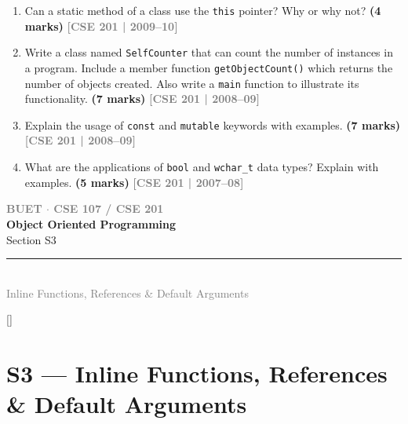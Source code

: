 \documentclass[12pt,a3paper]{article}
\newcommand{\yr}[1]{\hfill\textcolor{gray}{\small\textbf{[#1]}}}
\newcommand{\mk}[1]{\textcolor{orange!70!black}{\small\textbf{(#1 marks)}}}
\newcommand{\secdivider}[4]{%
  \newpage\thispagestyle{empty}%
  \vspace*{\fill}%
  \begin{tcolorbox}[enhanced,colback=#4!7,colframe=#3,boxrule=1.5pt,arc=8pt,
    left=20pt,right=20pt,top=22pt,bottom=22pt,
    shadow={3pt}{-3pt}{0pt}{black!15}]
    \centering
    {\large\textcolor{gray}{\textbf{BUET $\cdot$ CSE 107 / CSE 201}}}\\[8pt]
    {\fontsize{26}{32}\selectfont\bfseries\textcolor{#3}{Object Oriented Programming}}\\[6pt]
    {\fontsize{15}{19}\selectfont\textcolor{dgray}{#1}}\\[12pt]
    \textcolor{#3!60}{\rule{0.5\textwidth}{0.5pt}}\\[6pt]
    {\small\textcolor{gray}{#2}}
  \end{tcolorbox}%
  \vspace*{\fill}\newpage%
}
\begin{document}
\begin{enumerate}
\item Can a static method of a class use the \texttt{this} pointer? Why or why not? \mk{4}
\yr{CSE 201 | 2009--10}




\item Write a class named \texttt{SelfCounter} that can count the number of instances in a program. Include a member function \texttt{getObjectCount()} which returns the number of objects created. Also write a \texttt{main} function to illustrate its functionality. \mk{7}
\yr{CSE 201 | 2008--09}




\item Explain the usage of \texttt{const} and \texttt{mutable} keywords with examples. \mk{7}
\yr{CSE 201 | 2008--09}




\item What are the applications of \texttt{bool} and \texttt{wchar\_t} data types? Explain with examples. \mk{5}
\yr{CSE 201 | 2007--08}








\end{enumerate}
\newpage

\secdivider{Section S3}{Inline Functions, References \& Default Arguments}{cC}{cC}
\label{sec:S3}
\titleformat{\section}{\large\bfseries\color{cC}}{}{0em}{}[\titlerule]
\section{S3 --- Inline Functions, References \& Default Arguments}
\end{document}
